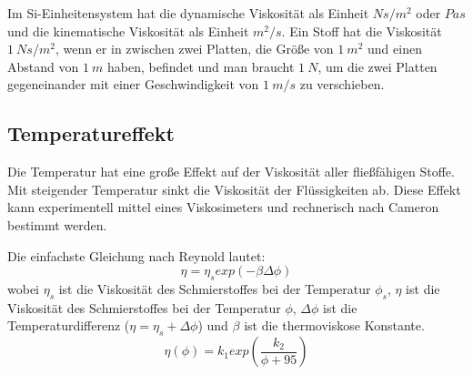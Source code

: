 Im Si-Einheitensystem hat die dynamische Viskosität als Einheit $N  s/m^2$ oder $Pa  s$ und die kinematische Viskosität als Einheit $m^2/s$.
Ein Stoff hat die Viskosität $1~N  s/m^2$, wenn er in zwischen zwei Platten, die Größe von $1~m^2$ und einen Abstand von $1~m$ haben, befindet und man braucht $1~N$, um die zwei Platten gegeneinander mit einer Geschwindigkeit von $1~m/s$ zu verschieben.

\subsection*{Temperatureffekt}
\label{sub:temperatureffekt}
Die Temperatur hat eine große Effekt auf der Viskosität aller fließfähigen Stoffe.
Mit steigender Temperatur sinkt die Viskosität der Flüssigkeiten ab.
Diese Effekt kann experimentell mittel eines Viskosimeters und rechnerisch nach Cameron bestimmt werden.

Die einfachste Gleichung nach Reynold lautet:
\begin{equation}
    \eta = \eta_{s}  exp (-\beta  \Delta\phi)
    \label{eq:dynamische_viskositaet_reynold}
\end{equation}
%
wobei $\eta_{s}$ ist die Viskosität des Schmierstoffes bei der Temperatur $\phi_{s}$, $\eta$ ist die Viskosität des Schmierstoffes bei der Temperatur $\phi$, $\Delta{\phi}$ ist die Temperaturdifferenz ($\eta = \eta_{s} + \Delta{\phi}$) und $\beta$ ist die thermoviskose Konstante.
\begin{equation}
    \eta(\phi) = k_1  exp \left( \frac{k_2}{\phi + 95} \right)
    \label{eq:dynamische_viskositaet_cameron}
\end{equation}

